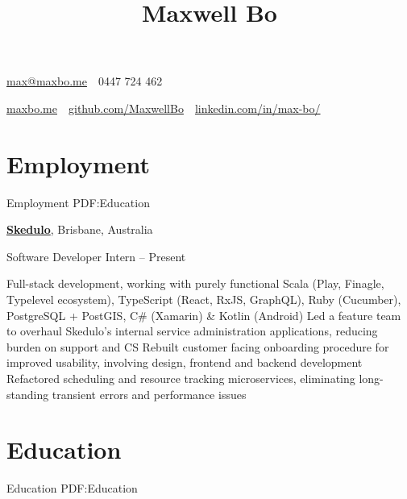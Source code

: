\documentclass[a4paper,10pt,oneside]{article}
\begin{document}

\title{Maxwell Bo}

\begin{subtitle}
\par \href{mailto:max@maxbo.me}{max@maxbo.me} \,\BulletSymbol\, 0447 724 462

\par \href{http://maxbo.me/}{maxbo.me} 
\,\BulletSymbol\, 
\href{https://github.com/MaxwellBo}{github.com/MaxwellBo}
\,\BulletSymbol\, 
\href{https://www.linkedin.com/in/max-bo/}{linkedin.com/in/max-bo/}

\end{subtitle}

\begin{body}


\section
{Employment}
{Employment}
{PDF:Education}

\href{https://skedulo.com/}{\textbf{Skedulo}}, Brisbane, Australia
\par Software Developer Intern\hfill {} -- Present 
\begin{detail}
	\BulletItem Full-stack development, working with purely functional Scala (Play, Finagle, Typelevel ecosystem),\newline
	TypeScript (React, RxJS, GraphQL), Ruby (Cucumber), PostgreSQL + PostGIS, C\# (Xamarin) \& Kotlin (Android)
	\BulletItem Led a feature team to overhaul Skedulo's internal service administration applications, reducing burden on support and CS
	\BulletItem Rebuilt customer facing onboarding procedure for improved usability, involving design, frontend and backend development
	\BulletItem Refactored scheduling and resource tracking microservices, eliminating long-standing transient errors and performance issues
\end{detail}


\section
{Education}
{Education}
{PDF:Education}


\end{body}
\end{document}
